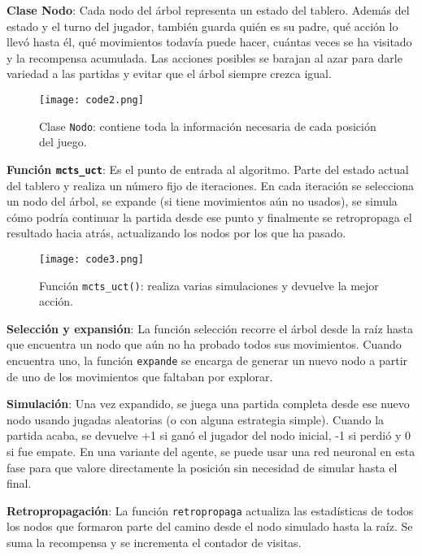 \documentclass[conference]{IEEEtran}
\begin{document}
\textbf{Clase Nodo}: Cada nodo del árbol representa un estado del tablero. Además del estado y el turno del jugador, también guarda quién es su padre, qué acción lo llevó hasta él, qué movimientos todavía puede hacer, cuántas veces se ha visitado y la recompensa acumulada. Las acciones posibles se barajan al azar para darle variedad a las partidas y evitar que el árbol siempre crezca igual.

\begin{figure}[htbp]
    \centerline{\texttt{[image: code2.png]}}
    \caption{Clase \texttt{Nodo}: contiene toda la información necesaria de cada posición del juego.}
\end{figure}

\textbf{Función \texttt{mcts\_uct}}: Es el punto de entrada al algoritmo. Parte del estado actual del tablero y realiza un número fijo de iteraciones. En cada iteración se selecciona un nodo del árbol, se expande (si tiene movimientos aún no usados), se simula cómo podría continuar la partida desde ese punto y finalmente se retropropaga el resultado hacia atrás, actualizando los nodos por los que ha pasado.

\begin{figure}[htbp]
    \centerline{\texttt{[image: code3.png]}}
    \caption{Función \texttt{mcts\_uct()}: realiza varias simulaciones y devuelve la mejor acción.}
\end{figure}

\textbf{Selección y expansión}: La función selección recorre el árbol desde la raíz hasta que encuentra un nodo que aún no ha probado todos sus movimientos. Cuando encuentra uno, la función \texttt{expande} se encarga de generar un nuevo nodo a partir de uno de los movimientos que faltaban por explorar.

\textbf{Simulación}: Una vez expandido, se juega una partida completa desde ese nuevo nodo usando jugadas aleatorias (o con alguna estrategia simple). Cuando la partida acaba, se devuelve +1 si ganó el jugador del nodo inicial, -1 si perdió y 0 si fue empate. En una variante del agente, se puede usar una red neuronal en esta fase para que valore directamente la posición sin necesidad de simular hasta el final.

\textbf{Retropropagación}: La función \texttt{retropropaga} actualiza las estadísticas de todos los nodos que formaron parte del camino desde el nodo simulado hasta la raíz. Se suma la recompensa y se incrementa el contador de visitas.
\end{document}
